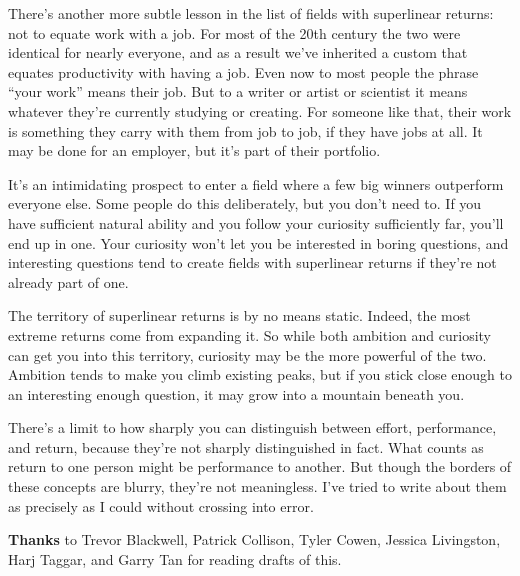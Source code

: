 There's another more subtle lesson in the list of fields with
superlinear returns: not to equate work with a job. For most of the 20th
century the two were identical for nearly everyone, and as a result
we've inherited a custom that equates productivity with having a job.
Even now to most people the phrase ``your work'' means their job. But to
a writer or artist or scientist it means whatever they're currently
studying or creating. For someone like that, their work is something
they carry with them from job to job, if they have jobs at all. It may
be done for an employer, but it's part of their portfolio.

It's an intimidating prospect to enter a field where a few big winners
outperform everyone else. Some people do this deliberately, but you
don't need to. If you have sufficient natural ability and you follow
your curiosity sufficiently far, you'll end up in one. Your curiosity
won't let you be interested in boring questions, and interesting
questions tend to create fields with superlinear returns if they're not
already part of one.

The territory of superlinear returns is by no means static. Indeed, the
most extreme returns come from expanding it. So while both ambition and
curiosity can get you into this territory, curiosity may be the more
powerful of the two. Ambition tends to make you climb existing peaks,
but if you stick close enough to an interesting enough question, it may
grow into a mountain beneath you.


There's a limit to how sharply you can distinguish between effort,
performance, and return, because they're not sharply distinguished in
fact. What counts as return to one person might be performance to
another. But though the borders of these concepts are blurry, they're
not meaningless. I've tried to write about them as precisely as I could
without crossing into error.

\textbf{Thanks} to Trevor Blackwell, Patrick Collison, Tyler Cowen,
Jessica Livingston, Harj Taggar, and Garry Tan for reading drafts of
this.